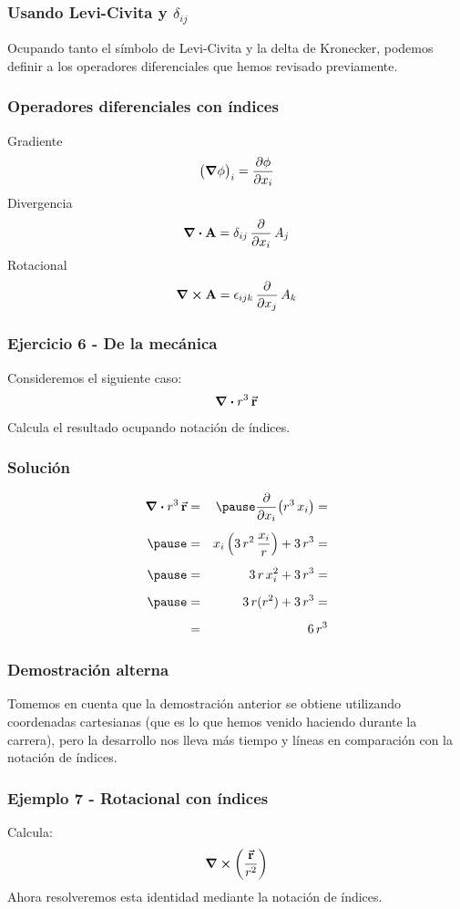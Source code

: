 \documentclass[12pt]{beamer}
\begin{document}
\begin{frame}
\frametitle{Usando Levi-Civita y $\delta_{ij}$}
Ocupando tanto el símbolo de Levi-Civita y la delta de Kronecker, podemos definir a los operadores diferenciales que hemos revisado previamente.
\end{frame}
\begin{frame}
\frametitle{Operadores diferenciales con índices}
Gradiente
\begin{align*}
\big( \grad{\phi} \big)_{i} = \pdv{\phi}{x_{i}}
\end{align*}
\pause
Divergencia
\begin{align*}
\div{\vb{A}} = \delta_{ij} \, \pdv{x_{i}} \, A_{j}
\end{align*}
\pause
Rotacional
\begin{align*}
\curl{\vb{A}} = \epsilon_{ijk} \, \pdv{x_{j}} \, A_{k}
\end{align*}
\end{frame}
\begin{frame}
\frametitle{Ejercicio 6 - De la mecánica}
Consideremos el siguiente caso:
\begin{align*}
\div{r^{3} \, \va{r}}
\end{align*}
Calcula el resultado ocupando notación de índices.
\end{frame}
\begin{frame}
\frametitle{Solución}
\begin{eqnarray*}
\div{r^{3} \, \va{r}} &=& \pause \pdv{x_{i}} \big( r^{3} \, x_{i} \big) = \\[0.5em] \pause
&=& x_{i} \left( 3 \, r^{2} \, \dfrac{x_{i}}{r} \right) + 3 \, r^{3} = \\[0.5em] \pause
&=& 3 \, r \, x_{i}^{2} + 3 \, r^{3} = \\[0.5em] \pause
&=& 3 \, r (r^{2}) + 3 \, r^{3} = \\[0.5em]
&=& 6 \, r^{3}
\end{eqnarray*}
\end{frame}
\begin{frame}
\frametitle{Demostración alterna}
Tomemos en cuenta que la demostración anterior se obtiene utilizando coordenadas cartesianas (que es lo que hemos venido haciendo durante la carrera), pero la desarrollo nos lleva más tiempo y líneas en comparación con la notación de índices.
\end{frame}
\begin{frame}
\frametitle{Ejemplo 7 - Rotacional con índices}
Calcula:
\begin{align*}
\curl{\left( \dfrac{\va{r}}{r^{2}} \right)}
\end{align*}
\pause
Ahora resolveremos esta identidad mediante la notación de índices.
\end{frame}
\end{document}
